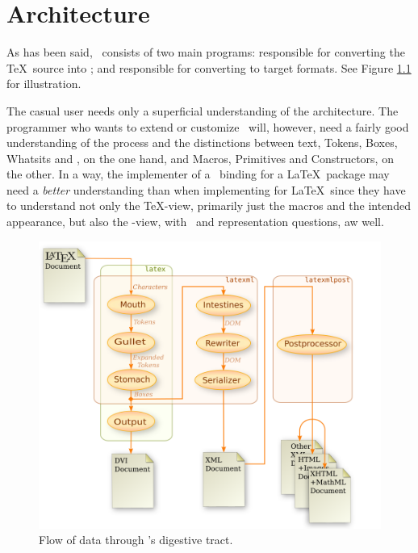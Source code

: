 \documentclass{book}
\begin{document}
\chapter{Architecture}\label{architecture}
As has been said, \LaTeXML\ consists of two main programs:
 responsible for converting the \TeX\ source into \XML;
and  responsible for converting to target formats.
See Figure \ref{architecture.dataflow} for illustration.

The casual user needs only a superficial understanding of the architecture.
The programmer who wants to extend or customize \LaTeXML\ will, however,
need a fairly good understanding of the process and the distinctions between
text, Tokens, Boxes, Whatsits and \XML, on the one hand,
and Macros, Primitives and Constructors, on the other.
In a way, the implementer of a \LaTeXML\ binding for a \LaTeX\ package may
need a \emph{better} understanding than when implementing for \LaTeX\
since they have to understand not only the \TeX-view, primarily just the macros
and the intended appearance, but also the \LaTeXML-view, with \XML\
and representation questions, aw well.

\begin{figure}[tb]
\begin{center}
\includegraphics[width=\textwidth]{figures/digestion}
\end{center}
\caption{Flow of data through \LaTeXML's digestive tract.\label{architecture.dataflow}}
\end{figure}
\end{document}
